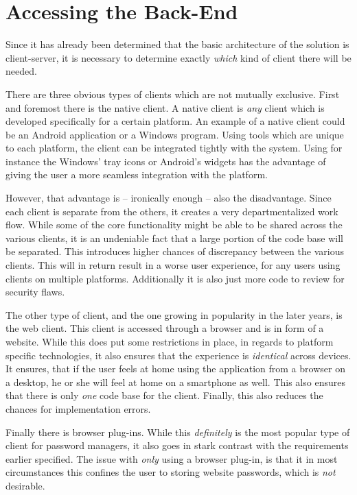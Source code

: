 	\section{Accessing the Back-End}
		\label{sec:design:frontend}
		Since it has already been determined that the basic architecture of the solution is client-server, it is necessary to determine exactly \emph{which} kind of client there will be needed. 

		There are three obvious types of clients which are not mutually exclusive. First and foremost there is the native client. A native client is \emph{any} client which is developed specifically for a certain platform. An example of a native client could be an Android application or a Windows program. Using tools which are unique to each platform, the client can be integrated tightly with the system. Using for instance the Windows' tray icons or Android's widgets has the advantage of giving the user a more seamless integration with the platform. 

		However, that advantage is -- ironically enough -- also the disadvantage. Since each client is separate from the others, it creates a very departmentalized work flow. While some of the core functionality might be able to be shared across the various clients, it is an undeniable fact that a large portion of the code base will be separated. This introduces higher chances of discrepancy between the various clients. This will in return result in a worse user experience, for any users using clients on multiple platforms. Additionally it is also just more code to review for security flaws.

		The other type of client, and the one growing in popularity in the later years, is the web client. This client is accessed through a browser and is in form of a website. While this does put some restrictions in place, in regards to platform specific technologies, it also ensures that the experience is \emph{identical} across devices. It ensures, that if the user feels at home using the application from a browser on a desktop, he or she will feel at home on a smartphone as well. This also ensures that there is only \emph{one} code base for the client. Finally, this also reduces the chances for implementation errors.

		Finally there is browser plug-ins. While this \emph{definitely} is the most popular type of client for password managers, it also goes in stark contrast with the requirements earlier specified. The issue with \emph{only} using a browser plug-in, is that it in most circumstances this confines the user to storing website passwords, which is \emph{not} desirable.

